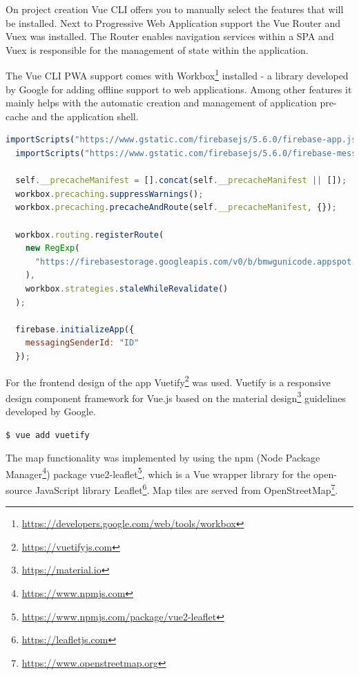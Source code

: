 On project creation Vue CLI offers you to manually select the features that will be installed. Next to Progressive Web Application support the Vue Router and Vuex was installed. The Router enables navigation services within a SPA and Vuex is responsible for the management of state within the application.


The Vue CLI PWA support comes with Workbox\footnote{\url{https://developers.google.com/web/tools/workbox}} installed - a library developed by Google for adding offline support to web applications. Among other features it mainly helps with the automatic creation and management of application pre-cache and the application shell.

\pagebreak

\begin{lstlisting}[language=JavaScript, caption=Service Worker with Workbox and Firebase specific initiation (firebase-messaging-sw.js), label=lst:serviceworker]
  importScripts("https://www.gstatic.com/firebasejs/5.6.0/firebase-app.js");
  importScripts("https://www.gstatic.com/firebasejs/5.6.0/firebase-messaging.js");

  self.__precacheManifest = [].concat(self.__precacheManifest || []);
  workbox.precaching.suppressWarnings();
  workbox.precaching.precacheAndRoute(self.__precacheManifest, {});

  workbox.routing.registerRoute(
    new RegExp(
      "https://firebasestorage.googleapis.com/v0/b/bmwgunicode.appspot.com/.*"
    ),
    workbox.strategies.staleWhileRevalidate()
  );

  firebase.initializeApp({
    messagingSenderId: "ID"
  });

\end{lstlisting}

For the frontend design of the app Vuetify\footnote{\url{https://vuetifyjs.com}} was used. Vuetify is a responsive design component framework for Vue.js based on the material design\footnote{\url{https://material.io}} guidelines developed by Google.

\begin{lstlisting}[language=bash, caption=Command to add Vuetify to a Vue.js project, label=lst:vuetify]
  $ vue add vuetify
\end{lstlisting}

The map functionality was implemented by using the npm (Node Package Manager\footnote{\url{https://www.npmjs.com}}) package vue2-leaflet\footnote{\url{https://www.npmjs.com/package/vue2-leaflet}}, which is a Vue wrapper library for the open-source JavaScript library Leaflet\footnote{\url{https://leafletjs.com}}. Map tiles are served from OpenStreetMap\footnote{\url{https://www.openstreetmap.org}}.

